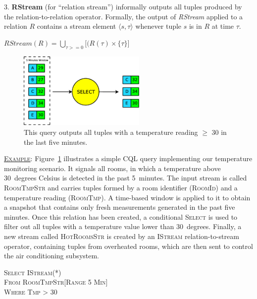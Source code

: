 3. \textbf{RStream} (for ``relation stream'') informally outputs all tuples produced by the
relation-to-relation operator. Formally, the output of \textit{RStream} applied to a relation $R$
contains a stream element $\langle s, \tau \rangle$ whenever tuple $s$ is in $R$ at time $\tau$.

\begin{center}
	$RStream(R) = \bigcup_{\tau>=0}\Big[(R(\tau)\times\{\tau\}\Big]$ %
\end{center}	

\begin{figure}[b]
	\centering
	\includegraphics[width=0.55\textwidth]{img/tesi/cql-example} %
	\caption{This query outputs all tuples with a temperature reading $\geq$ 30 in the last five minutes.}
	\label{fig:cql-example}
\end{figure}
\vspace{15pt}
\underline{\textsc{Example}}: Figure~\ref{fig:cql-example} illustrates a simple CQL query implementing
our temperature monitoring scenario. It signals all rooms, in which a temperature above 30~degrees
Celsius is detected in the past 5~minutes. The input stream is called \textsc{RoomTmpStr} and carries
tuples formed by a room identifier (\textsc{RoomId}) and a temperature reading (\textsc{RoomTmp}). A time-based window
is applied to it to obtain a snapshot that contains only fresh measurements generated in the past five
minutes. Once this relation has been created, a conditional \textsc{Select} is used to filter
out all tuples with a temperature value lower than 30~degrees. Finally, a new stream called
\textsc{HotRoomsStr} is created by an \textsc{IStream} relation-to-stream operator, containing tuples
from overheated rooms, which are then sent to control the air conditioning subsystem.
\vspace{15pt}

\tab \textsc{Select IStream(*)} \\
\tab \textsc{From RoomTmpStr[Range 5 Min]} \\
\tab \textsc{Where Tmp > 30} \\

